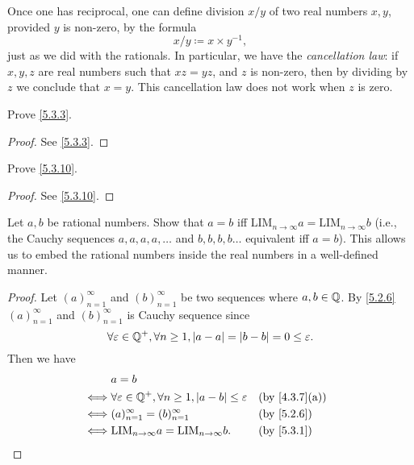 \begin{note}
  Once one has reciprocal, one can define division \(x / y\) of two real numbers \(x, y\), provided \(y\) is non-zero, by the formula
  \[
    x / y \coloneqq x \times y^{-1},
  \]
  just as we did with the rationals.
  In particular, we have the \emph{cancellation law}:
  if \(x, y, z\) are real numbers such that \(xz = yz\), and \(z\) is non-zero, then by dividing by \(z\) we conclude that \(x = y\).
  This cancellation law does not work when \(z\) is zero.
\end{note}

\exercisesection

\begin{ex}\label{ex:5.3.1}
  Prove \cref{5.3.3}.
\end{ex}

\begin{proof}
  See \cref{5.3.3}.
\end{proof}

\begin{ex}\label{ex:5.3.2}
  Prove \cref{5.3.10}.
\end{ex}

\begin{proof}
  See \cref{5.3.10}.
\end{proof}

\begin{ex}\label{ex:5.3.3}
  Let \(a, b\) be rational numbers.
  Show that \(a = b\) iff \(\text{LIM}_{n \to \infty} a = \text{LIM}_{n \to \infty} b\) (i.e., the Cauchy sequences \(a, a, a, a, \dots\) and \(b, b, b, b \dots\) equivalent iff \(a = b\)).
  This allows us to embed the rational numbers inside the real numbers in a well-defined manner.
\end{ex}

\begin{proof}
  Let \((a)_{n = 1}^{\infty}\) and \((b)_{n = 1}^{\infty}\) be two sequences where \(a, b \in \mathbb{Q}\).
  By \cref{5.2.6} \((a)_{n = 1}^\infty\) and \((b)_{n = 1}^\infty\) is Cauchy sequence since
  \[
    \forall \varepsilon \in \mathbb{Q}^+, \forall n \geq 1, \left\lvert a - a\right\rvert = \left\lvert b - b\right\rvert = 0 \leq \varepsilon.
  \]
  Then we have
  \begin{align*}
         & a = b                                                                                           \\
    \iff & \forall \varepsilon \in \Q^+, \forall n \geq 1, \abs{a - b} \leq \varepsilon &  & \by{4.3.7}[a] \\
    \iff & (a)_{n = 1}^\infty = (b)_{n = 1}^\infty                                      &  & \by{5.2.6}    \\
    \iff & \text{LIM}_{n \to \infty} a = \text{LIM}_{n \to \infty} b.                   &  & \by{5.3.1}
  \end{align*}
\end{proof}

